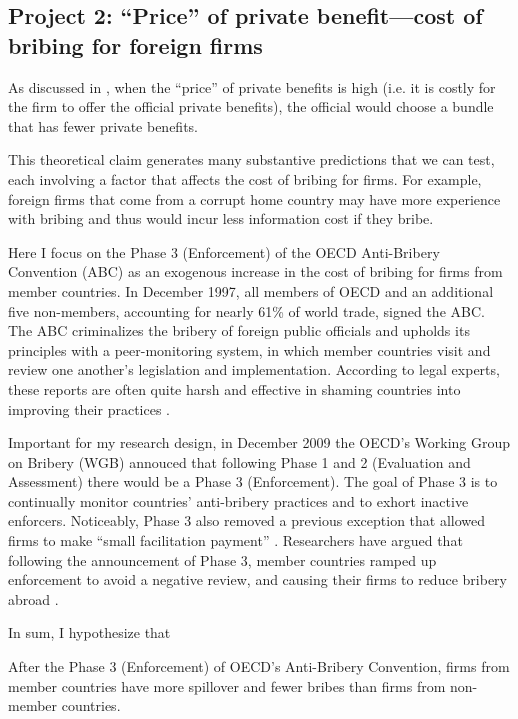 \subsection{Project 2: ``Price'' of private benefit---cost of bribing for foreign firms}

As discussed in , when the ``price'' of private benefits is high (i.e. it is costly for the firm to offer the official private benefits), the official would choose a bundle that has fewer private benefits.

This theoretical claim generates many substantive predictions that we can test, each involving a factor that affects the cost of bribing for firms. For example, foreign firms that come from a corrupt home country may have more experience with bribing and thus would incur less information cost if they bribe.

Here I focus on the Phase 3 (Enforcement) of the OECD Anti-Bribery Convention (ABC) as an exogenous increase in the cost of bribing for firms from member countries. In December 1997, all members of OECD and an additional five non-members, accounting for nearly 61\% of world trade, signed the ABC. The ABC criminalizes the bribery of foreign public officials and upholds its principles with a peer-monitoring system, in which member countries visit and review one another's legislation and implementation. According to legal experts, these reports are often quite harsh and effective in shaming countries into improving their practices \citep{Tyler2011}.

Important for my research design, in December 2009 the OECD's Working Group on Bribery (WGB) annouced that following Phase 1 and 2 (Evaluation and Assessment) there would be a Phase 3 (Enforcement). The goal of Phase 3 is to continually monitor countries' anti-bribery practices and to exhort inactive enforcers. Noticeably, Phase 3 also removed a previous exception that allowed firms to make ``small facilitation payment'' \citep{Strauss2013}. Researchers have argued that following the announcement of Phase 3, member countries ramped up enforcement to avoid a negative review, and causing their firms to reduce bribery abroad \citep{Malesky2015b}. 

In sum, I hypothesize that

\begin{hyp}
After the Phase 3 (Enforcement) of OECD's Anti-Bribery Convention, firms from member countries have more spillover and fewer bribes than firms from non-member countries.
\end{hyp}

